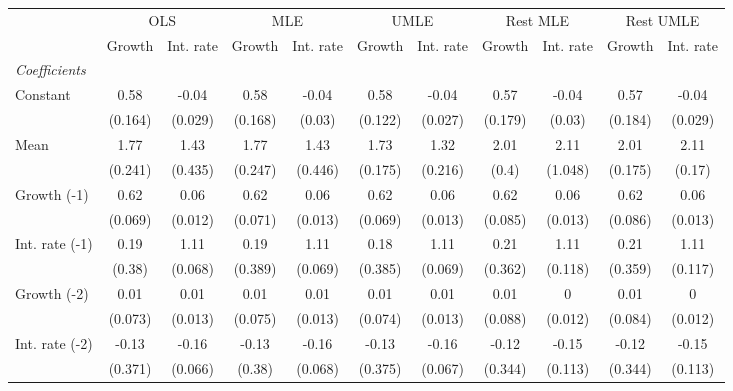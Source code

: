 \begin{table}[htbp] 
	\centering 
	\begin{tabular}{@{\extracolsep{4pt}}lcccccccccc@{}}		\hline\hline
		 		 & \multicolumn{2}{c}{OLS} &\multicolumn{2}{c}{MLE} &\multicolumn{2}{c}{UMLE} &\multicolumn{2}{c}{Rest MLE} &\multicolumn{2}{c}{Rest UMLE} \\ 
 		 & Growth 	 & Int. rate 	 & Growth 	 & Int. rate 	 & Growth 	 & Int. rate 	 & Growth 	 & Int. rate 	 & Growth 	 & Int. rate\\\cline{2-3}\cline{4-5}\cline{6-7}\cline{8-9}\cline{10-11}
\rule{0pt}{4ex} 
 \emph{Coefficients} 	  		 & 		 & 		 & 		 & 		 & 		 & 		 & 		 & 		 & 		 &\\ 
\quad Constant 	 & 0.58 	 & -0.04 	 & 0.58 	 & -0.04 	 & 0.58 	 & -0.04 	 & 0.57 	 & -0.04 	 & 0.57 	 & -0.04	 \\ 
 		 & (0.164) 	 & (0.029) 	 & (0.168) 	 & (0.03) 	 & (0.122) 	 & (0.027) 	 & (0.179) 	 & (0.03) 	 & (0.184) 	 & (0.029) 	 \\ 
\quad Mean 	 & 1.77 	 & 1.43 	 & 1.77 	 & 1.43 	 & 1.73 	 & 1.32 	 & 2.01 	 & 2.11 	 & 2.01 	 & 2.11	 \\ 
 		 & (0.241) 	 & (0.435) 	 & (0.247) 	 & (0.446) 	 & (0.175) 	 & (0.216) 	 & (0.4) 	 & (1.048) 	 & (0.175) 	 & (0.17) 	 \\ 
\quad Growth (-1) 	 &0.62 	 & 0.06 	 & 0.62 	 & 0.06 	 & 0.62 	 & 0.06 	 & 0.62 	 & 0.06 	 & 0.62 	 & 0.06	 \\ 
 		 & (0.069) 	 & (0.012) 	 & (0.071) 	 & (0.013) 	 & (0.069) 	 & (0.013) 	 & (0.085) 	 & (0.013) 	 & (0.086) 	 & (0.013) 	 \\ 
\quad Int. rate (-1) 	 &0.19 	 & 1.11 	 & 0.19 	 & 1.11 	 & 0.18 	 & 1.11 	 & 0.21 	 & 1.11 	 & 0.21 	 & 1.11	 \\ 
 		 & (0.38) 	 & (0.068) 	 & (0.389) 	 & (0.069) 	 & (0.385) 	 & (0.069) 	 & (0.362) 	 & (0.118) 	 & (0.359) 	 & (0.117) 	 \\ 
\quad Growth (-2) 	 &0.01 	 & 0.01 	 & 0.01 	 & 0.01 	 & 0.01 	 & 0.01 	 & 0.01 	 & 0 	 & 0.01 	 & 0	 \\ 
 		 & (0.073) 	 & (0.013) 	 & (0.075) 	 & (0.013) 	 & (0.074) 	 & (0.013) 	 & (0.088) 	 & (0.012) 	 & (0.084) 	 & (0.012) 	 \\ 
\quad Int. rate (-2) 	 &-0.13 	 & -0.16 	 & -0.13 	 & -0.16 	 & -0.13 	 & -0.16 	 & -0.12 	 & -0.15 	 & -0.12 	 & -0.15	 \\ 
 		 & (0.371) 	 & (0.066) 	 & (0.38) 	 & (0.068) 	 & (0.375) 	 & (0.067) 	 & (0.344) 	 & (0.113) 	 & (0.344) 	 & (0.113) 	 \\ 

\end{tabular}
\end{table}

